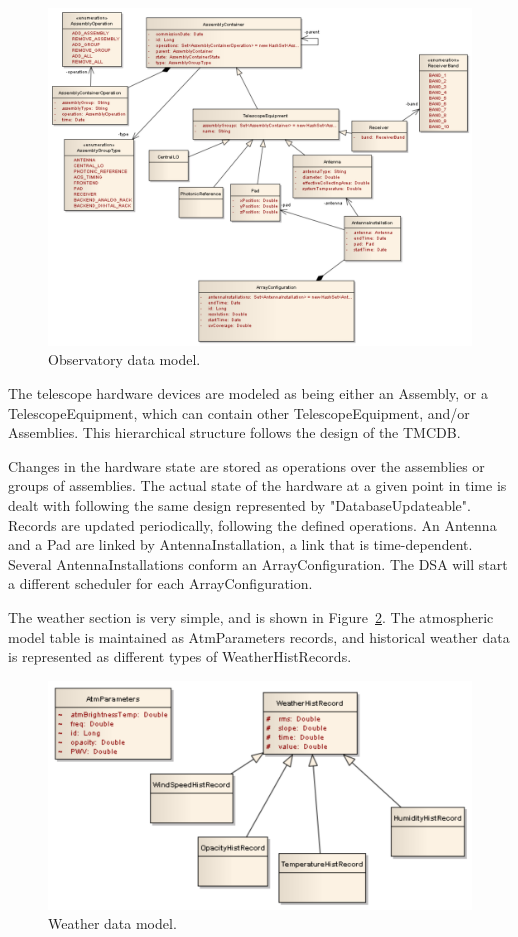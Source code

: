 \documentclass{article}
\begin{document}
\begin{figure}
\includegraphics[width=\textwidth]{Observatory.pdf}
\caption{Observatory data model.}
\label{fig:observatorydm}
\end{figure}

The telescope hardware devices are modeled as being either an Assembly, or a TelescopeEquipment, which
can contain other TelescopeEquipment, and/or Assemblies. This hierarchical structure follows the design
of the TMCDB.

Changes in the hardware state are stored as operations over the assemblies or groups of assemblies. The
actual state of the hardware at a given point in time is dealt with following the same design represented
by "DatabaseUpdateable". Records are updated periodically, following the defined operations.
An Antenna and a Pad are linked by AntennaInstallation, a link that is time-dependent. Several
AntennaInstallations conform an ArrayConfiguration. The DSA will start a different scheduler for each
ArrayConfiguration.

The weather section is very simple, and is shown in Figure~\ref{fig:weatherdm}. The atmospheric model table is
maintained as AtmParameters records, and historical weather data is represented as different types of
WeatherHistRecords.

\begin{figure}
\includegraphics[width=\textwidth]{Weather.pdf}
\caption{Weather data model.}
\label{fig:weatherdm}
\end{figure}
\end{document}

